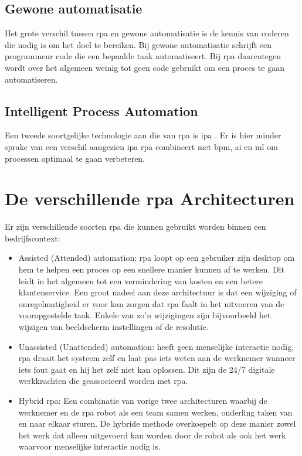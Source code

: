 \subsection{Gewone automatisatie}
Het grote verschil tussen \acrshort{rpa} en gewone automatisatie is de kennis van coderen die nodig is om het doel te bereiken. Bij gewone automatisatie schrijft een programmeur code die een bepaalde taak automatiseert. Bij \acrshort{rpa} daarentegen wordt over het algemeen weinig tot geen code gebruikt om een proces te gaan automatiseren. \autocite{rpaVsScript}

\subsection{Intelligent Process Automation}
Een tweede soortgelijke technologie aan die van \acrshort{rpa} is \acrfull{ipa} . Er is hier minder sprake van een verschil aangezien \acrshort{ipa} \acrshort{rpa} combineert met \acrshort{bpm}, \acrshort{ai} en \acrfull{ml} om processen optimaal te gaan verbeteren.
\autocite{everythingRPA}

\section{De verschillende \acrshort{rpa} Architecturen}
Er zijn verschillende soorten \acrshort{rpa} die kunnen gebruikt worden binnen een bedrijfscontext:

\begin{itemize}
	\item Assisted (Attended) automation: \acrshort{rpa} loopt op een gebruiker zijn desktop om hem te helpen een proces op een snellere manier kunnen af te werken. Dit leidt in het algemeen tot een vermindering van kosten en een betere klantenservice. Een groot nadeel aan deze architectuur is dat een wijziging of onregelmatigheid er voor kan zorgen dat \acrshort{rpa} faalt in het uitvoeren van de vooropgestelde taak. Enkele van zo'n wijzigingen zijn bijvoorbeeld het wijzigen van beeldscherm instellingen of de resolutie.
	\item Unassisted (Unattended) automation: heeft geen menselijke interactie nodig, \acrshort{rpa} draait het systeem zelf en laat pas iets weten aan de werknemer wanneer iets fout gaat en hij het zelf niet kan oplossen. Dit zijn de 24/7 digitale werkkrachten die geassocieerd worden met \acrshort{rpa}.
	\item Hybrid \acrshort{rpa}: Een combinatie van vorige twee architecturen waarbij de werknemer en de \acrshort{rpa} robot als een team samen werken, onderling taken van en naar elkaar sturen. De hybride methode overkoepelt op deze manier zowel het werk dat alleen uitgevoerd kan worden door de robot als ook het werk waarvoor menselijke interactie nodig is.
\end{itemize}

